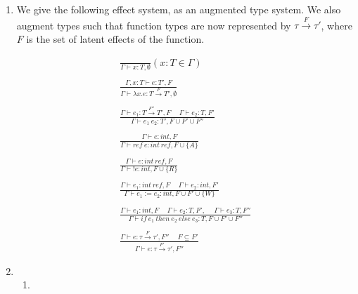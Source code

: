 


\begin{enumerate}[label=(\alph*)]

  \item
    We give the following effect system, as an augmented type system. We also augment types such that function types are now represented by $\tau \xrightarrow{F} \tau'$, where $F$ is the set of latent effects of the function.

     \begin{align*}
       \frac{}{\Gamma \vdash x : T, \emptyset}(x:T \in \Gamma)\\\\
       \frac{\Gamma, x : T \vdash e: T', F}{\Gamma \vdash \lambda x. e : T \xrightarrow{F} T', \emptyset}\\\\
       \frac{\Gamma \vdash e_1 : T \xrightarrow{F''} T', F \hspace{15pt} \Gamma \vdash e_2 : T, F'}{\Gamma \vdash e_1\ e_2: T', F \cup F' \cup F''}\\\\
       \frac{\Gamma \vdash e : int, F}{\Gamma \vdash ref\ e : int\ ref, F \cup \{A\}}\\\\
       \frac{\Gamma \vdash e : int\ ref, F}{\Gamma \vdash !e : int, F \cup \{R\}}\\\\
       \frac{\Gamma \vdash e_1: int\ ref, F \hspace{15pt} \Gamma \vdash e_2: int, F'}{\Gamma \vdash e_1 := e_2 : int, F \cup F' \cup \{W\}}\\\\
       \frac{\Gamma \vdash e_1: int, F \hspace{15pt} \Gamma \vdash e_2 : T, F', \hspace{15pt} \Gamma \vdash e_3 : T, F''}{\Gamma \vdash if\ e_1\ then\ e_2\ else\ e_3 : T, F \cup F' \cup F''}\\\\
       \frac{\Gamma \vdash e : \tau \xrightarrow{F} \tau', F'' \hspace{15pt} F \subseteq F'}{\Gamma \vdash e : \tau \xrightarrow{F'} \tau', F''}
     \end{align*}

     \item
       \begin{enumerate}[label=(\roman*)]
         \item
           


\end{enumerate}
\end{enumerate}
